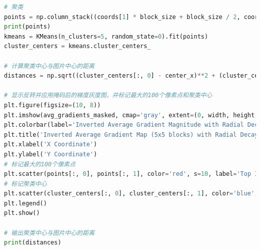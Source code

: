 \documentclass{ctexart}
\begin{document}
\begin{lstlisting}[language=Python, caption={寻找最优着陆点代码}, xleftmargin=0pt]
# 聚类
points = np.column_stack((coords[1] * block_size + block_size / 2, coords[0] * block_size + block_size / 2))
print(points)
kmeans = KMeans(n_clusters=5, random_state=0).fit(points)
cluster_centers = kmeans.cluster_centers_

# 计算聚类中心与图片中心的距离
distances = np.sqrt((cluster_centers[:, 0] - center_x)**2 + (cluster_centers[:, 1] - center_y)**2)

# 显示反转并应用掩码后的梯度灰度图，并标记最大的100个像素点和聚类中心
plt.figure(figsize=(10, 8))
plt.imshow(avg_gradients_masked, cmap='gray', extent=(0, width, height, 0))
plt.colorbar(label='Inverted Average Gradient Magnitude with Radial Decay Mask')
plt.title('Inverted Average Gradient Map (5x5 blocks) with Radial Decay Mask')
plt.xlabel('X Coordinate')
plt.ylabel('Y Coordinate')
# 标记最大的100个像素点
plt.scatter(points[:, 0], points[:, 1], color='red', s=10, label='Top 100 Points')
# 标记聚类中心
plt.scatter(cluster_centers[:, 0], cluster_centers[:, 1], color='blue', s=50, marker='x', label='Cluster Centers')
plt.legend()
plt.show()

# 输出聚类中心与图片中心的距离
print(distances)

\end{lstlisting}
\end{document}
